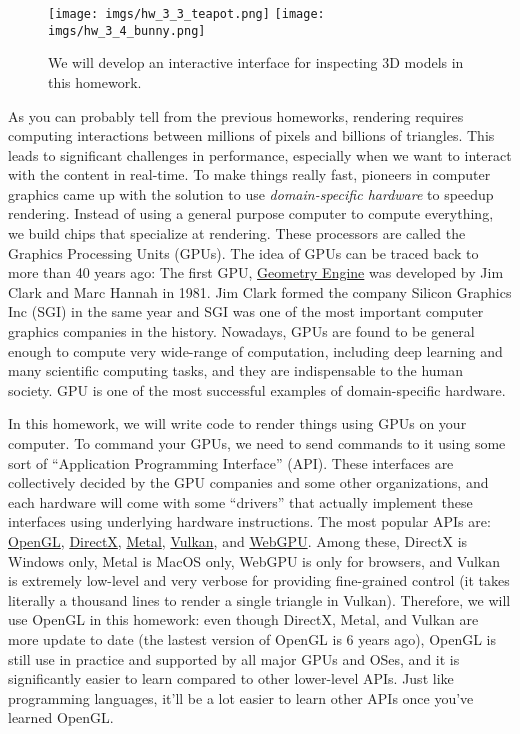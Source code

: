 




\begin{figure}[ht]
    \centering
    \texttt{[image: imgs/hw\_3\_3\_teapot.png]}
    \texttt{[image: imgs/hw\_3\_4\_bunny.png]}
    \caption{We will develop an interactive interface for inspecting 3D models in this homework.}
    \label{fig:teaser}
\end{figure}

As you can probably tell from the previous homeworks, rendering requires computing interactions between millions of pixels and billions of triangles. This leads to significant challenges in performance, especially when we want to interact with the content in real-time. To make things really fast, pioneers in computer graphics came up with the solution to use \emph{domain-specific hardware} to speedup rendering. Instead of using a general purpose computer to compute everything, we build chips that specialize at rendering. These processors are called the Graphics Processing Units (GPUs). The idea of GPUs can be traced back to more than 40 years ago: The first GPU, \href{https://www.computer.org/publications/tech-news/chasing-pixels/geometry-engine}{Geometry Engine} was developed by Jim Clark and Marc Hannah in 1981. Jim Clark formed the company Silicon Graphics Inc (SGI) in the same year and SGI was one of the most important computer graphics companies in the history. Nowadays, GPUs are found to be general enough to compute very wide-range of computation, including deep learning and many scientific computing tasks, and they are indispensable to the human society. GPU is one of the most successful examples of domain-specific hardware.

In this homework, we will write code to render things using GPUs on your computer. To command your GPUs, we need to send commands to it using some sort of ``Application Programming Interface'' (API). These interfaces are collectively decided by the GPU companies and some other organizations, and each hardware will come with some ``drivers'' that actually implement these interfaces using underlying hardware instructions. The most popular APIs are: \href{https://en.wikipedia.org/wiki/OpenGL}{OpenGL}, \href{https://en.wikipedia.org/wiki/DirectX}{DirectX}, \href{https://en.wikipedia.org/wiki/Metal_(API)}{Metal}, \href{https://en.wikipedia.org/wiki/Vulkan}{Vulkan}, and \href{https://en.wikipedia.org/wiki/WebGPU}{WebGPU}. Among these, DirectX is Windows only, Metal is MacOS only, WebGPU is only for browsers, and Vulkan is extremely low-level and very verbose for providing fine-grained control (it takes literally a thousand lines to render a single triangle in Vulkan). Therefore, we will use OpenGL in this homework: even though DirectX, Metal, and Vulkan are more update to date (the lastest version of OpenGL is 6 years ago), OpenGL is still use in practice and supported by all major GPUs and OSes, and it is significantly easier to learn compared to other lower-level APIs. Just like programming languages, it'll be a lot easier to learn other APIs once you've learned OpenGL.

